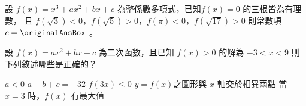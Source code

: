 \begin{QUESTIONS}
\begin{QUESTION}
    \begin{QBODY}
        設 $f\left( x \right)={{x}^{3}}+a{{x}^{2}}+bx+c$ 為整係數多項式，已知$f\left( x \right)=0$ 的三根皆為有理數，
        且 $f\left( \sqrt{3} \right)<0$，$f\left( \sqrt{5} \right)>0$，$f\left( \pi  \right)<0$，$f\left( \sqrt{17} \right)>0$
        則常數項 $c = \originalAnsBox $ 。   
    \end{QBODY}
    \begin{QFROMS}
    \end{QFROMS}
    \begin{QTAGS} \end{QTAGS}
    \begin{QANS}
    \end{QANS}
    \begin{QSOL}
    \end{QSOL}
    \begin{QEMPTYSPACE}
    \end{QEMPTYSPACE}
\end{QUESTION}
\begin{QUESTION}
    \begin{QBODY}
        設 $f\left( x \right)=a{{x}^{2}}+bx+c$ 為二次函數，且已知 $f\left( x \right)>0$ 的解為 $-3<x<9$ 
        則下列敘述哪些是正確的？
        \begin{QOPS}
           \QOP $a<0$ 
           \QOP $a+b+c=-32$
           \QOP $f\left( 3x \right)\le 0$
           \QOP $y=f\left( x \right)$之圖形與 $x$ 軸交於相異兩點
           \QOP 當 $x=3$ 時，$f\left( x \right)$ 有最大值
        \end{QOPS}       
    \end{QBODY}
    \begin{QFROMS}
    \end{QFROMS}

\end{QUESTION}
\end{QUESTIONS}
